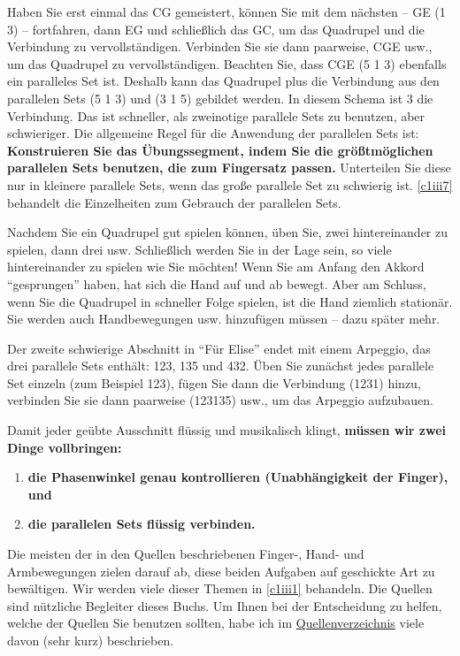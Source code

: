 Haben Sie erst einmal das CG gemeistert, können Sie mit dem nächsten -- GE (1 3) -- fortfahren, dann EG und schließlich das GC, um das Quadrupel und die Verbindung zu vervollständigen.
Verbinden Sie sie dann paarweise, CGE usw., um das Quadrupel zu vervollständigen.
Beachten Sie, dass CGE (5 1 3) ebenfalls ein paralleles Set ist.
Deshalb kann das Quadrupel plus die Verbindung aus den parallelen Sets (5 1 3) und (3 1 5) gebildet werden.
In diesem Schema ist 3 die Verbindung.
Das ist schneller, als zweinotige parallele Sets zu benutzen, aber schwieriger.
Die allgemeine Regel für die Anwendung der parallelen Sets ist: \textbf{Konstruieren Sie das Übungssegment, indem Sie die größtmöglichen parallelen Sets benutzen, die zum Fingersatz passen.}
Unterteilen Sie diese nur in kleinere parallele Sets, wenn das große parallele Set zu schwierig ist.
\hyperref[c1iii7]{\autoref{c1iii7}} behandelt die Einzelheiten zum Gebrauch der parallelen Sets.

Nachdem Sie ein Quadrupel gut spielen können, üben Sie, zwei hintereinander zu spielen, dann drei usw.
Schließlich werden Sie in der Lage sein, so viele hintereinander zu spielen wie Sie möchten!
Wenn Sie am Anfang den Akkord \enquote{gesprungen} haben, hat sich die Hand auf und ab bewegt.
Aber am Schluss, wenn Sie die Quadrupel in schneller Folge spielen, ist die Hand ziemlich stationär.
Sie werden auch Handbewegungen usw. hinzufügen müssen -- dazu später mehr.

Der zweite schwierige Abschnitt in \enquote{Für Elise} endet mit einem Arpeggio, das drei parallele Sets enthält: 123, 135 und 432.
Üben Sie zunächst jedes parallele Set einzeln (zum Beispiel 123), fügen Sie dann die Verbindung (1231) hinzu, verbinden Sie sie dann paarweise (123135) usw., um das Arpeggio aufzubauen.

Damit jeder geübte Ausschnitt flüssig und musikalisch klingt, \textbf{müssen wir zwei Dinge vollbringen:}

\begin{enumerate}[label={\arabic*.}] 
\item \textbf{die Phasenwinkel genau kontrollieren (Unabhängigkeit der Finger), und}
\item \textbf{die parallelen Sets flüssig verbinden.}
\end{enumerate}

Die meisten der in den Quellen beschriebenen Finger-, Hand- und Armbewegungen zielen darauf ab, diese beiden Aufgaben auf geschickte Art zu bewältigen.
Wir werden viele dieser Themen in \hyperref[c1iii1]{\autoref{c1iii1}} behandeln.
Die Quellen sind nützliche Begleiter dieses Buchs.
Um Ihnen bei der Entscheidung zu helfen, welche der Quellen Sie benutzen sollten, habe ich im \hyperref[reference]{Quellenverzeichnis} viele davon (sehr kurz) beschrieben.

